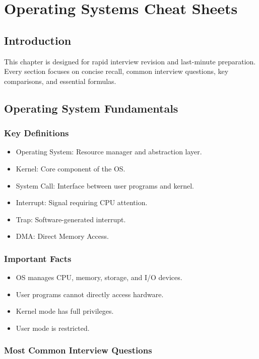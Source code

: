 \chapter{Operating Systems Cheat Sheets}

\section{Introduction}

This chapter is designed for rapid interview revision and last-minute preparation. Every section focuses on concise recall, common interview questions, key comparisons, and essential formulas.

\section{Operating System Fundamentals}

\subsection*{Key Definitions}

\begin{itemize}
\item Operating System: Resource manager and abstraction layer.
\item Kernel: Core component of the OS.
\item System Call: Interface between user programs and kernel.
\item Interrupt: Signal requiring CPU attention.
\item Trap: Software-generated interrupt.
\item DMA: Direct Memory Access.
\end{itemize}

\subsection*{Important Facts}

\begin{itemize}
\item OS manages CPU, memory, storage, and I/O devices.
\item User programs cannot directly access hardware.
\item Kernel mode has full privileges.
\item User mode is restricted.
\end{itemize}

\subsection*{Most Common Interview Questions}

